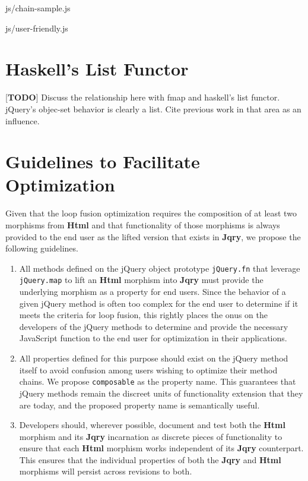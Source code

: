 \documentclass[preprint]{sigplanconf}
\begin{document}
\begin{lstinputlisting}[
    language=JavaScript,
    caption={Sources of Html objects},
    label={lst:chain-sample}
]{js/chain-sample.js}
\begin{lstinputlisting}[
    language=JavaScript,
    caption={User friendly overhead},
    label={lst:user-friendly}
]{js/user-friendly.js}
\section{Haskell's List Functor}

[\textbf{TODO}] Discuss the relationship here with fmap and haskell's list functor. jQuery's objec-set behavior is clearly a list. Cite previous work in that area as an influence.

\section{Guidelines to Facilitate Optimization}

Given that the loop fusion optimization requires the composition of at least two morphisms from \textbf{Html} and that functionality of those morphisms is always provided to the end user as the lifted version that exists in \textbf{Jqry}, we propose the following guidelines.

\begin{enumerate}
  \item \label{item:standard-1} All methods defined on the jQuery object prototype \verb|jQuery.fn| that leverage \verb|jQuery.map| to lift an \textbf{Html} morphism into \textbf{Jqry} must provide the underlying morphism as a property for end users. Since the behavior of a given jQuery method is often too complex for the end user to determine if it meets the criteria for loop fusion, this rightly places the onus on the developers of the jQuery methods to determine and provide the necessary JavaScript function to the end user for optimization in their applications.
  \item \label{item:standard-2} All properties defined for this purpose should exist on the jQuery method itself to avoid confusion among users wishing to optimize their method chains. We propose \verb|composable| as the property name. This guarantees that jQuery methods remain the discreet units of functionality extension that they are today, and the proposed property name is semantically useful.
  \item \label{item:standard-3}Developers should, wherever possible, document and test both the \textbf{Html} morphism and its \textbf{Jqry} incarnation as discrete pieces of functionality to ensure that each \textbf{Html} morphism works independent of its \textbf{Jqry} counterpart. This ensures that the individual properties of both the \textbf{Jqry} and \textbf{Html} morphisms will persist across revisions to both.
\end{enumerate}


\end{lstinputlisting}
\end{lstinputlisting}
\end{document}
